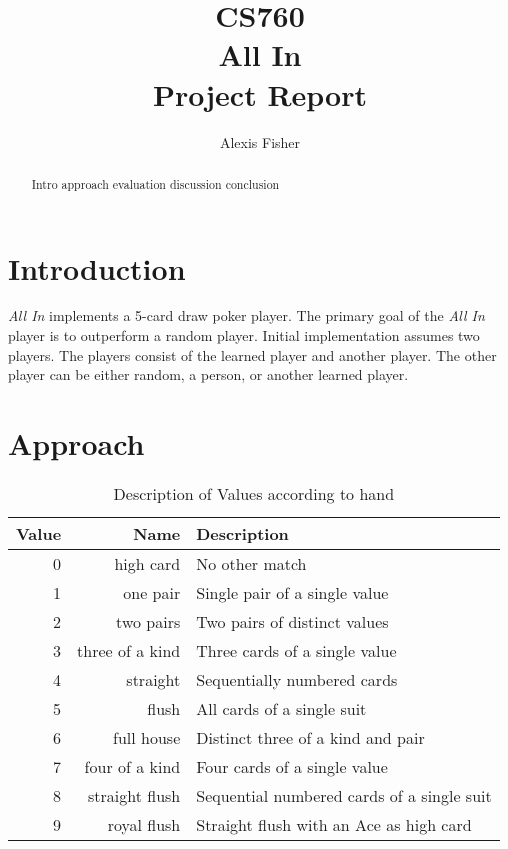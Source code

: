 \documentclass[12pt,pdftex,twocolumn]{article}
\title{CS760 \\ All In \\ Project Report }
\author{  Alexis Fisher }
\begin{document}
\ifpdf
{}
\else
{}
\fi
\maketitle
\begin{abstract}
Intro approach evaluation discussion conclusion
\end{abstract}
\section{Introduction}
\emph{All In} implements a 5-card draw poker player. The primary goal of the \emph{All In} player is to outperform a random player. Initial implementation assumes two players. The players consist of the learned player and another player. The other player can be either random, a person, or another learned player. 

\section{Approach}
\begin{table*}[ht]
\centering
	\begin{tabular}{| r | r | l |}
\hline
\textbf{Value} & \textbf{Name} & \textbf{Description} \\
\hline
0 & high card & No other match \\
1 & one pair & Single pair of a single value\\
2 & two pairs & Two pairs of distinct values\\
3 & three of a kind & Three cards of a single value\\
4 & straight & Sequentially numbered cards\\
5 & flush & All cards of a single suit\\
6 & full house & Distinct three of a kind and pair\\
7 & four of a kind & Four cards of a single value\\
8 & straight flush & Sequential numbered cards of a single suit\\
9 & royal flush & Straight flush with an Ace as high card\\
\hline
\end{tabular}
\caption{Description of Values according to hand}
\label{tab:cardvalues}
\end{table*}
\end{document}

